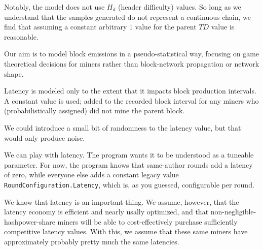 \documentclass[11pt]{article}
\theoremstyle{plain}
\begin{document}
Notably, the model does not use $H_d$ (header difficulty) values.
So long as we understand that the samples generated do not represent a continuous
chain, we find that assuming a constant arbitrary $1$ value for the
parent $TD$ value is reasonable.

Our aim is to model block emissions in a pseudo-statistical way,
focusing on game theoretical decisions for miners rather than
block-network propagation or network shape.

Latency is modeled only to the extent that it impacts block production
intervals. A constant value is used; added to the recorded block interval
for any miners who (probabilistically assigned) did not mine the
parent block.

%
%

%

We could introduce a small bit of randomness to the latency value, but that
would only produce noise.

We can play with latency. The program wants it to be understood as a tuneable
parameter. For now, the program knows that same-author rounds add a latency of
zero, while everyone else adds a constant legacy value
\texttt{RoundConfiguration.Latency}, which is, as you guessed, configurable per 
round.

We know that latency is an important thing.
We assume, however, that the latency economy is efficient and nearly usally 
optimized,
and that non-negligible-hashpower-share miners will be able to cost-effectively
purchase sufficiently competitive latency values. With this, we assume that
these same miners have approximately probably pretty much the same latencies.
\end{document}
